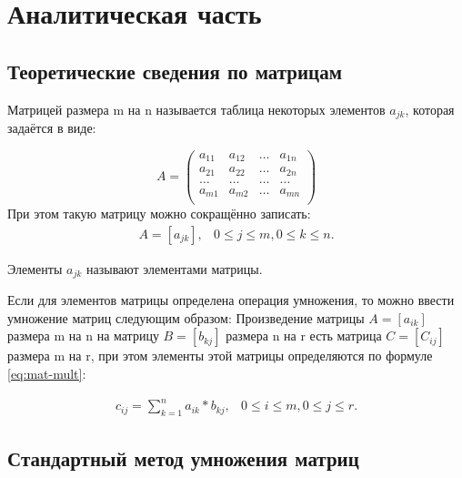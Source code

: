 \chapter{Аналитическая часть}
\section{Теоретические сведения по матрицам}

Матрицей \cite[390 с.]{math} размера m на n называется таблица некоторых элементов $a_{jk}$, которая задаётся в виде:

\begin{equation}
	\label{eq:matrix}
	A = \begin{pmatrix}
		a_{11} & a_{12} & \dots & a_{1n} \\
		a_{21} & a_{22} & \dots & a_{2n} \\
		\dots & \dots & \dots & \dots \\
		a_{m1} & a_{m2} & \dots & a_{mn} \\
	\end{pmatrix}
\end{equation}
При этом такую матрицу можно сокращённо записать:
\begin{equation}
	\label{eq:mat-form}
	\begin{matrix}
		A = [a_{jk}], &0 \leq j \leq m, 0 \leq k \leq n.
	\end{matrix}
\end{equation}

Элементы $a_{jk}$ называют элементами матрицы.

Если для элементов матрицы определена операция умножения, то можно ввести умножение матриц \cite[392 c.]{math} следующим образом: Произведение матрицы $A = [a_{ik}]$ размера m на n на матрицу $B = [b_{kj}]$ размера n на r есть матрица $C = [C_{ij}]$ размера m на r, при этом элементы этой матрицы определяются по формуле \ref{eq:mat-mult}:

\begin{equation}
	\label{eq:mat-mult}
	\begin{matrix}
		c_{ij} = \sum_{k=1}^{n}a_{ik}*b_{kj}, &0 \leq i \leq m, 0 \leq j \leq r.
	\end{matrix}
\end{equation} 


\section{Стандартный метод умножения матриц}

